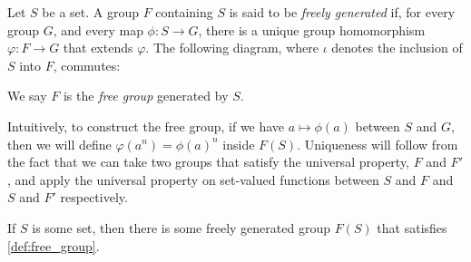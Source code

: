 \begin{definition}\label{def:free_group}
  Let $S$ be a set. A group $F$ containing $S$ is said to be \textit{freely generated} if, for every group $G$, and every map $\phi\colon S\rightarrow G$, there is a unique group homomorphism $\varphi\colon F\rightarrow G$ that extends $\varphi$. The following diagram, where $\iota$ denotes the inclusion of $S$ into $F$, commutes:
  \begin{center}
  \end{center}
We say $F$ is the \textit{free group} generated by $S$.
\end{definition}
Intuitively, to construct the free group, if we have $a\mapsto \phi(a)$ between $S$ and $G$, then we will define $\varphi\left(a^n\right) = \phi(a)^n$ inside $F(S)$. Uniqueness will follow from the fact that we can take two groups that satisfy the universal property, $F$ and $F'$, and apply the universal property on set-valued functions between $S$ and $F$ and $S$ and $F'$ respectively. 
\begin{theorem}\label{thm:free_group_existence}
  If $S$ is some set, then there is some freely generated group $F(S)$ that satisfies \ref{def:free_group}.
\end{theorem}
